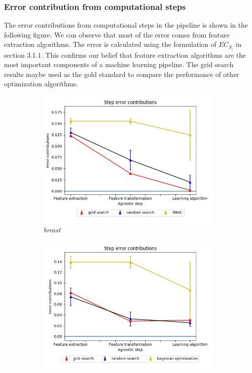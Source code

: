 \subsubsection{Error contribution from computational steps}
The error contributions from computational steps in the pipeline is shown in the following figure. We can observe that most of the error comes from feature extraction algorithms. The error is calculated using the formulation of $EC_{S_i}$ in section 3.1.1. This confirms our belief that feature extraction algorithms are the most important components of a machine learning pipeline. The grid search results maybe used as the gold standard to compare the performance of other optimization algorithms. 
\begin{figure}[H]
\centering
\begin{subfigure}{.5\textwidth}
  \centering
  \includegraphics[scale=0.37]{img/EP/agnostic_error_step_breast}
  \caption{\textit{breast}}
  \label{fig:sfig1}
\end{subfigure}%
\begin{subfigure}{.5\textwidth}
  \centering
  \includegraphics[scale=0.37]{img/EP/agnostic_error_step_brain}

\end{subfigure}
\end{figure}
